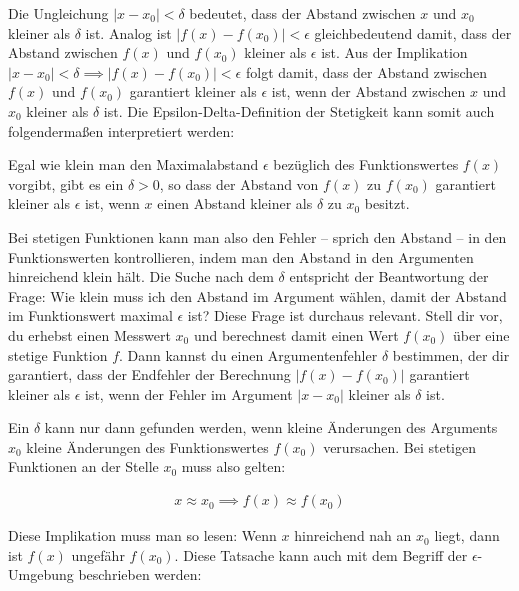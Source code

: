 \documentclass[fontsize=9pt,
               parskip=half-,
               DIV=14,
               listof=chapterentry,
               tocflat]{scrbook}
\begin{document}
Die Ungleichung $|x-x_{0}|<\delta $ bedeutet, dass der Abstand zwischen $x$ und $x_{0}$ kleiner als $\delta $ ist. Analog ist $|f(x)-f(x_{0})|<\epsilon $ gleichbedeutend damit, dass der Abstand zwischen $f(x)$ und $f(x_{0})$ kleiner als $\epsilon $ ist. Aus der Implikation $|x-x_{0}|<\delta \implies |f(x)-f(x_{0})|<\epsilon $ folgt damit, dass der Abstand zwischen $f(x)$ und $f(x_{0})$ garantiert kleiner als $\epsilon $ ist, wenn der Abstand zwischen $x$ und $x_{0}$ kleiner als $\delta $ ist. Die Epsilon-Delta-Definition der Stetigkeit kann somit auch folgendermaßen interpretiert werden:

\begin{importantparagraph*}
Egal wie klein man den Maximalabstand $\epsilon $ bezüglich des Funktionswertes $f(x)$ vorgibt, gibt es ein $\delta >0$, so dass der Abstand von $f(x)$ zu $f(x_{0})$ garantiert kleiner als $\epsilon $ ist, wenn $x$ einen Abstand kleiner als $\delta $ zu $x_{0}$ besitzt.

\end{importantparagraph*}

Bei stetigen Funktionen kann man also den Fehler – sprich den Abstand – in den Funktionswerten kontrollieren, indem man den Abstand in den Argumenten hinreichend klein hält. Die Suche nach dem $\delta $ entspricht der Beantwortung der Frage: Wie klein muss ich den Abstand im Argument wählen, damit der Abstand im Funktionswert maximal $\epsilon $ ist? Diese Frage ist durchaus relevant. Stell dir vor, du erhebst einen Messwert $x_{0}$ und berechnest damit einen Wert $f(x_{0})$ über eine stetige Funktion $f$. Dann kannst du einen Argumentenfehler $\delta $ bestimmen, der dir garantiert, dass der Endfehler der Berechnung $|f(x)-f(x_{0})|$ garantiert kleiner als $\epsilon $ ist, wenn der Fehler im Argument $|x-x_{0}|$ kleiner als $\delta $ ist.

Ein $\delta $ kann nur dann gefunden werden, wenn kleine Änderungen des Arguments $x_{0}$ kleine Änderungen des Funktionswertes $f(x_{0})$ verursachen. Bei stetigen Funktionen an der Stelle $x_{0}$ muss also gelten:

\begin{align*}
x\approx x_{0}\implies f(x)\approx f(x_{0})
\end{align*}

Diese Implikation muss man so lesen: Wenn $x$ hinreichend nah an $x_{0}$ liegt, dann ist $f(x)$ ungefähr $f(x_{0})$. Diese Tatsache kann auch mit dem Begriff der $\epsilon $-Umgebung beschrieben werden:
\end{document}
